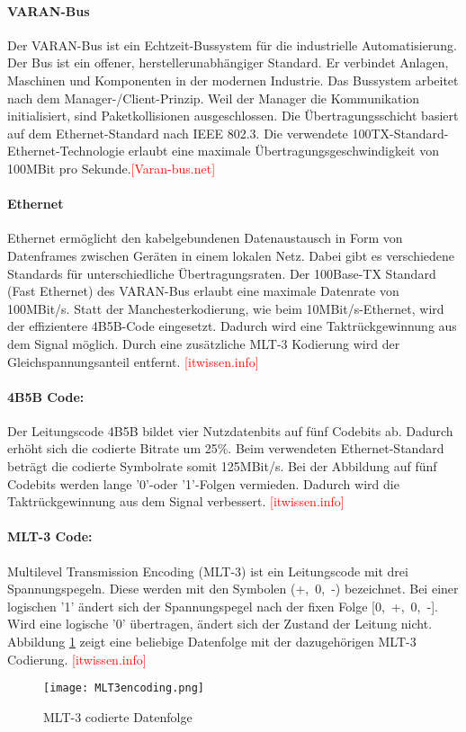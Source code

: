 \paragraph{VARAN-Bus}
Der VARAN-Bus ist ein Echtzeit-Bussystem für die industrielle Automatisierung. Der Bus ist ein offener, herstellerunabhängiger Standard. Er verbindet Anlagen, Maschinen und Komponenten in der modernen Industrie. Das Bussystem arbeitet nach dem Manager-/Client-Prinzip. Weil der Manager die Kommunikation initialisiert, sind Paketkollisionen ausgeschlossen. Die Übertragungsschicht basiert auf dem Ethernet-Standard nach IEEE 802.3. Die verwendete 100TX-Standard-Ethernet-Technologie erlaubt eine maximale Übertragungsgeschwindigkeit von 100MBit pro Sekunde.\textcolor{red}{[Varan-bus.net]}

\paragraph{Ethernet}
Ethernet ermöglicht den kabelgebundenen Datenaustausch in Form von Datenframes zwischen Geräten in einem lokalen Netz. Dabei gibt es verschiedene Standards für unterschiedliche Übertragungsraten. Der 100Base-TX Standard (Fast Ethernet) des VARAN-Bus erlaubt eine maximale Datenrate von 100MBit/s. Statt der Manchesterkodierung, wie beim 10MBit/s-Ethernet, wird der effizientere 4B5B-Code eingesetzt. Dadurch wird eine Taktrückgewinnung aus dem Signal möglich. Durch eine zusätzliche MLT-3 Kodierung wird der Gleichspannungsanteil entfernt. \textcolor{red}{[itwissen.info]}

\paragraph{4B5B Code:}
Der Leitungscode 4B5B bildet vier Nutzdatenbits auf fünf Codebits ab. Dadurch erhöht sich die codierte Bitrate um 25\%. Beim verwendeten Ethernet-Standard beträgt die codierte Symbolrate somit 125MBit/s. Bei der Abbildung auf fünf Codebits werden lange '0'-oder '1'-Folgen vermieden. Dadurch wird die Taktrückgewinnung aus dem Signal verbessert. \textcolor{red}{[itwissen.info]}

\paragraph{MLT-3 Code:}
Multilevel Transmission Encoding (MLT-3) ist ein Leitungscode mit drei Spannungspegeln. Diese werden mit den Symbolen (+,\ 0,\ -) bezeichnet. Bei einer logischen '1' ändert sich der Spannungspegel nach der fixen Folge [0,\ +,\ 0,\ -]. Wird eine logische '0' übertragen, ändert sich der Zustand der Leitung nicht. Abbildung \ref{fig:MLT3code} zeigt eine beliebige Datenfolge mit der dazugehörigen MLT-3 Codierung. \textcolor{red}{[itwissen.info]}
\begin{figure}[h]
\centering
\texttt{[image: MLT3encoding.png]}
\caption{MLT-3 codierte Datenfolge}\label{fig:MLT3code}
\end{figure}

